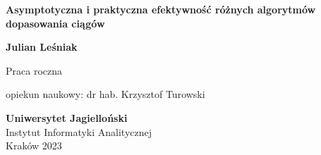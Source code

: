 \begin{titlepage}
    \begin{center}
        \vspace*{1cm}
        
        \Huge
        \textbf{Asymptotyczna i praktyczna efektywność różnych algorytmów dopasowania ciągów}
        
        \vspace{1cm}
        \LARGE
    
        \textbf{Julian Leśniak}
        
        \vfill
        
        Praca roczna
        
        \Large
    
        opiekun naukowy: dr hab. Krzysztof Turowski

        \vspace{1.8cm}
        
        \textbf{Uniwersytet Jagielloński}\\
        Instytut Informatyki Analitycznej\\
        Kraków 2023
        
    \end{center}
    
\end{titlepage}